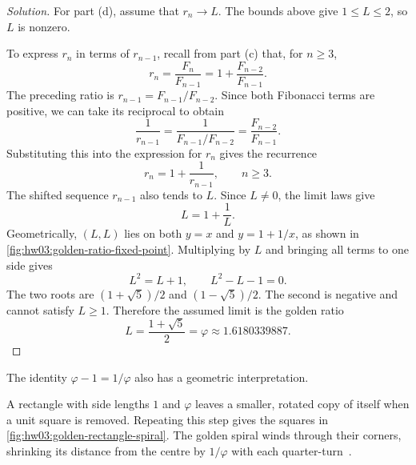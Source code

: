 \begin{proof}[Solution]
  For part (d), assume that $r_n\to L$. The bounds above give
  $1\leq L\leq2$, so $L$ is nonzero.
  \begin{marginfigure}
    \centering
    
    \caption[The golden ratio as a fixed point.]{The positive intersection
      satisfies $\varphi=1+1/\varphi$. Dotted guides locate both coordinates
      at $\varphi\approx1.618$. The axes use equal units.}
    \label{fig:hw03:golden-ratio-fixed-point}
  \end{marginfigure}
  To express $r_n$ in terms of $r_{n-1}$, recall from part (c) that,
  for $n\geq3$,
  \[
    r_n=\frac{F_n}{F_{n-1}}=1+\frac{F_{n-2}}{F_{n-1}}.
  \]
  The preceding ratio is $r_{n-1}=F_{n-1}/F_{n-2}$. Since both
  Fibonacci terms are positive, we can take its reciprocal to obtain
  \[
    \frac{1}{r_{n-1}}
      =\frac{1}{F_{n-1}/F_{n-2}}
      =\frac{F_{n-2}}{F_{n-1}}.
  \]
  Substituting this into the expression for $r_n$ gives the recurrence
  \[
    r_n=1+\frac{1}{r_{n-1}},\qquad n\geq3.
  \]
  The shifted sequence $r_{n-1}$ also tends to $L$. Since $L\neq0$,
  the limit laws give
  \[
    L=1+\frac{1}{L}.
  \]
  Geometrically, $(L,L)$ lies on both $y=x$ and $y=1+1/x$, as shown
  in \autoref{fig:hw03:golden-ratio-fixed-point}.
  Multiplying by $L$ and bringing all terms to one side gives
  \[
    L^2=L+1,\qquad L^2-L-1=0.
  \]
  The two roots are $(1+\sqrt{5})/2$ and $(1-\sqrt{5})/2$.
  The second is negative and cannot satisfy $L\geq1$. Therefore the
  assumed limit is the golden ratio
  \[
    L=\frac{1+\sqrt{5}}{2}=\varphi\approx1.6180339887.
  \]
\end{proof}

The identity $\varphi-1=1/\varphi$ also has a geometric interpretation.
\begin{marginfigure}
  \centering
  
  \caption[The golden rectangle and golden spiral.]{A golden rectangle
    subdivides into squares with side lengths
    $1,\varphi^{-1},\varphi^{-2},\ldots$. The golden spiral passes through
    successive corners. Each quarter-turn inward shrinks the distance
    from its centre by $1/\varphi$. The subdivision continues indefinitely.}
  \label{fig:hw03:golden-rectangle-spiral}
\end{marginfigure}
A rectangle with side lengths $1$ and $\varphi$ leaves a smaller,
rotated copy of itself when a unit square is removed. Repeating this
step gives the squares in \autoref{fig:hw03:golden-rectangle-spiral}.
The golden spiral winds through their corners, shrinking its distance
from the centre by $1/\varphi$ with each
quarter-turn~\cite{Duan2019GoldenSpirals}.
